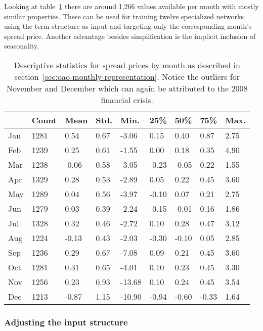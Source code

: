 Looking at table~\ref{tab:spreads-by-month} there are around 1,266 values available per month with mostly similar properties. These can be used for training twelve specialized networks using the term structure as input and targeting only the corresponding month's spread price. Another advantage besides simplification is the implicit inclusion of seasonality.

\begin{table}
	\centering
	\caption[Descriptive statistics for spread prices by month]{Descriptive statistics for spread prices by month as described in section~\ref{sec:oao-monthly-representation}. Notice the outliers for November and December which can again be attributed to the 2008 financial crisis.}
\begin{tabular}{lllllllll}
	\toprule
	{} &  Count &   Mean &  Std. &    Min. &   25\% &   50\% &   75\% &  Max. \\
	\midrule
	Jan &  1281 &   0.54 &  0.67 &   -3.06 &   0.15 &   0.40 &   0.87 &  2.75 \\
	Feb &  1239 &   0.25 &  0.61 &   -1.55 &   0.00 &   0.18 &   0.35 &  4.90 \\
	Mar &  1238 &  -0.06 &  0.58 &   -3.05 &  -0.23 &  -0.05 &   0.22 &  1.55 \\
	Apr &  1329 &   0.28 &  0.53 &   -2.89 &   0.05 &   0.22 &   0.45 &  3.60 \\
	May &  1289 &   0.04 &  0.56 &   -3.97 &  -0.10 &   0.07 &   0.21 &  2.75 \\
	Jun &  1279 &   0.03 &  0.39 &   -2.24 &  -0.15 &  -0.01 &   0.16 &  1.86 \\
	Jul &  1328 &   0.32 &  0.46 &   -2.72 &   0.10 &   0.28 &   0.47 &  3.12 \\
	Aug &  1224 &  -0.13 &  0.43 &   -2.03 &  -0.30 &  -0.10 &   0.05 &  2.85 \\
	Sep &  1236 &   0.29 &  0.67 &   -7.08 &   0.09 &   0.21 &   0.45 &  3.60 \\
	Oct &  1281 &   0.31 &  0.65 &   -4.01 &   0.10 &   0.23 &   0.45 &  3.30 \\
	Nov &  1256 &   0.23 &  0.93 &  -13.68 &   0.10 &   0.24 &   0.45 &  3.54 \\
	Dec &  1213 &  -0.87 &  1.15 &  -10.90 &  -0.94 &  -0.60 &  -0.33 &  1.64 \\
	\bottomrule
	\end{tabular}
	\label{tab:spreads-by-month}
\end{table}

\subsubsection{Adjusting the input structure}

